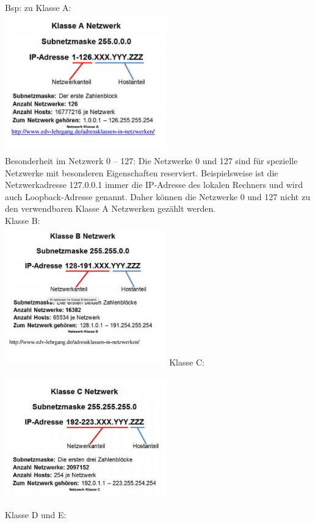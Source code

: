 \documentclass[12pt,a4paper]{report}
\begin{document}
Bsp: zu Klasse A:\\
\includegraphics[width = 7cm, height = 6cm]{classa.jpg}
\\
Besonderheit im Netzwerk 0 – 127:
Die Netzwerke 0 und 127 sind für spezielle Netzwerke mit besonderen Eigenschaften
reserviert. Beispielsweise ist die Netzwerkadresse 127.0.0.1 immer die IP-Adresse des lokalen
Rechners und wird auch Loopback-Adresse genannt. Daher können die Netzwerke 0 und 127
nicht zu den verwendbaren Klasse A Netzwerken gezählt werden.\\
Klasse B:\\
\includegraphics[width = 7cm, height = 6cm]{classb.jpg}
\newpage
Klasse C:\\
\includegraphics[width = 7cm, height = 6cm]{classc.jpg}
\\
Klasse D und E:\\
\end{document}
